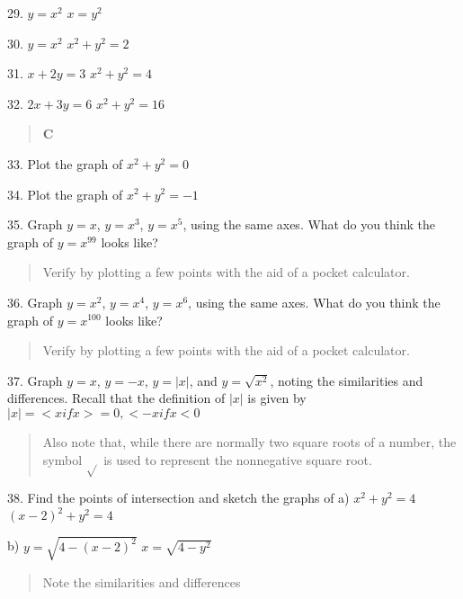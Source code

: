 \documentclass[10pt,letterpaper]{article}
\begin{document}
29.
$y=x^2$
$x= y^2$

30.
$y=x^2$
$x^2+y^2=2$

31.
$x+ 2y=3$
$x^2+y^2=4$

32.
$2x+3y=6$
$x^2+y^2=16$

\begin{quote}
\textbf{C}
\end{quote}

33. Plot the graph of $x^2+y^2=0$

34. Plot the graph of $x^2+y^2=-1$

35. Graph $y=x$, $y=x^3$, $y=x^5$, using the same axes. What do you think the graph of $y= x^{99}$ looks like?
\begin{quote}
Verify by plotting a few points with the aid of a pocket calculator. 
\end{quote}

36. Graph $y=x^2$, $y=x^4$, $y=x^6$, using the same axes. What do you think the graph of $y=x^{100}$ looks like?
\begin{quote}
Verify by plotting a few points with the aid of a pocket calculator. 
\end{quote}

37. Graph $y=x$, $y=-x$, $y=|x|$, and $y=\sqrt{x^2}$, noting the similarities and differences. Recall that the definition of $|x|$ is given by
$ |x|=< x if x >= 0, <-x if x < 0$
\begin{quote}
Also note that, while there are normally two square roots of a number, the symbol $\sqrt{}$ is used to represent the nonnegative square root.
\end{quote}

38. Find the points of intersection and sketch the graphs of
a) $x^2+y^2 =4$
    $(x-2)^2+y^2=4$

b) $y=\sqrt{4-(x-2)^2}$
    $x=\sqrt{4-y^2}$

    \begin{quote}
    Note the similarities and differences
    \end{quote}
\end{document}
